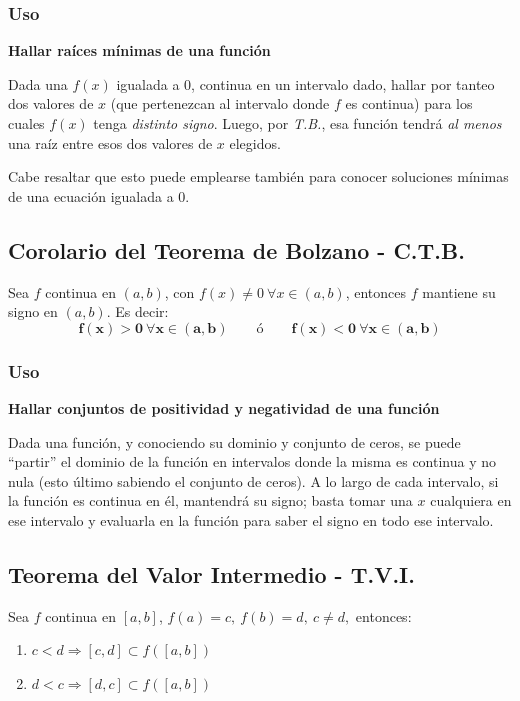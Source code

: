 \documentclass[11pt,titlepage]{article}
\newcommand{\littleTitle}[1]{
	\noindent \ignorespaces
	\small \textbf{#1} \normalsize
	\ignorespaces \ignorespacesafterend
}
\newcommand{\comillas}[1]{``#1''}
\begin{document}
\subsubsection{Uso} \label{usobolzano}
\littleTitle{Hallar raíces mínimas de una función}\par
Dada una $f(x)$ igualada a $0$, continua en un intervalo dado, hallar por tanteo dos valores de $x$ (que pertenezcan 
al intervalo donde $f$ es continua) para los cuales $f(x)$ tenga \emph{distinto signo}. Luego, por \emph{T.B.}, esa 
función tendrá \emph{al menos} una raíz entre esos dos valores de $x$ elegidos.\par
Cabe resaltar que esto puede emplearse también para conocer soluciones mínimas de una ecuación igualada a $0$.

\subsection{Corolario del Teorema de Bolzano - C.T.B.} \label{ctb}
\begin{commBoxy}
	Sea $f$ continua en $(a,b)$, con $f(x) \neq 0 \ \forall x \in (a,b)$, entonces $f$ mantiene su signo en $(a,b)$. Es decir:
	\begin{equation}
		\boldsymbol{f(x) > 0 \ \forall x \in (a,b) \qquad \text{ó} \qquad f(x) < 0 \ \forall x \in (a,b)} 
	\end{equation}
\end{commBoxy}

\subsubsection{Uso}
\littleTitle{Hallar conjuntos de positividad y negatividad de una función}\par
Dada una función, y conociendo su dominio y conjunto de ceros, se puede \comillas{partir} el dominio de la función en intervalos donde la misma es
continua y no nula (esto último sabiendo el conjunto de ceros). A lo largo de cada intervalo, si la función es continua en él, mantendrá 
su signo; basta tomar una $x$ cualquiera en ese intervalo y evaluarla en la función para saber el signo en todo ese intervalo.

\subsection{Teorema del Valor Intermedio - T.V.I.}
Sea $f$ continua en $[a,b]$, $f(a) = c, \ f(b) = d, \ c \neq d,$ entonces:
\begin{enumerate}[label=\alph*.]
	\item $c < d \Rightarrow [c,d] \subset f\left([a,b]\right)$
	\item $d < c \Rightarrow [d,c] \subset f\left([a,b]\right)$
\end{enumerate}
\end{document}
